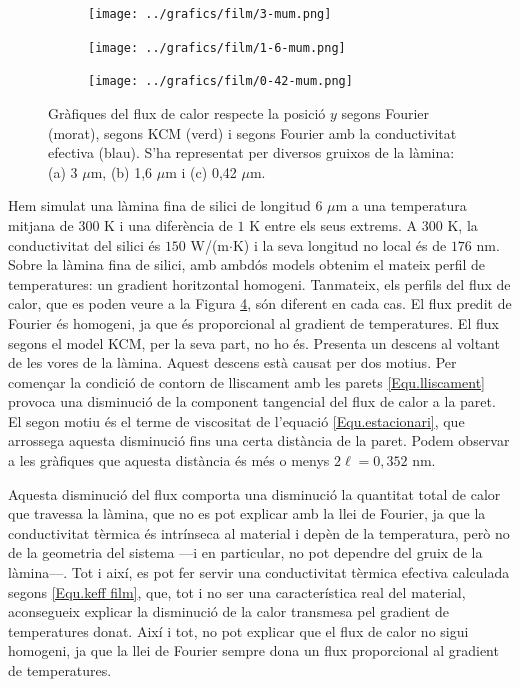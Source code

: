 \documentclass{article}
\begin{document}
\begin{figure}[ht!]
\begin{center}
\begin{subfigure}{.5\textwidth}
\caption{}
\label{Fig:3mum}
\texttt{[image: ../grafics/film/3-mum.png]}
\end{subfigure}
\begin{subfigure}{.45\textwidth}
\caption{}
\label{Fig:1,6mum}
\texttt{[image: ../grafics/film/1-6-mum.png]}
\end{subfigure}
\begin{subfigure}{.4\textwidth}
\caption{}
\label{Fig:0,42mum}
\texttt{[image: ../grafics/film/0-42-mum.png]}
\end{subfigure}
\caption{Gr\`{a}fiques del flux de calor respecte la posici\'{o} $y$ segons Fourier (morat), segons KCM (verd) i segons Fourier amb la conductivitat efectiva (blau). S'ha representat per diversos gruixos de la l\`{a}mina: (a) 3 $\mu$m, (b) 1,6 $\mu$m i (c) 0,42 $\mu$m.}
\label{Fig:Fluxoslaminars}
\end{center}
\end{figure}

Hem simulat una l\`{a}mina fina de silici de longitud $6$ $\mu$m a una temperatura mitjana de $300$ K i una difer\`{e}ncia de $1$ K entre els seus extrems. A $300$ K, la conductivitat del silici \'{e}s $150$ W/(m$\cdot$K) i la seva longitud no local \'{e}s de $176$ nm. Sobre la l\`{a}mina fina de silici, amb ambd\'{o}s models obtenim el mateix perfil de temperatures: un gradient horitzontal homogeni. Tanmateix, els perfils del flux de calor, que es poden veure a la Figura \ref{Fig:Fluxoslaminars}, s\'{o}n diferent en cada cas. El flux predit de Fourier \'{e}s homogeni, ja que \'{e}s proporcional al gradient de temperatures. El flux segons el model KCM, per la seva part, no ho \'{e}s. Presenta un descens al voltant de les vores de la l\`{a}mina. Aquest descens est\`{a} causat per dos motius. Per comen\c{c}ar la condici\'{o} de contorn de lliscament amb les parets \eqref{Equ.lliscament} provoca una disminuci\'{o} de la component tangencial del flux de calor a la paret. El segon motiu \'{e}s el terme de viscositat de l'equaci\'{o} \eqref{Equ.estacionari}, que arrossega aquesta disminuci\'{o} fins una certa dist\`{a}ncia de la paret. Podem observar a les gr\`{a}fiques que aquesta dist\`{a}ncia \'{e}s m\'{e}s o menys $2\ell=0,352$ nm.

Aquesta disminuci\'{o} del flux comporta una disminuci\'{o} la quantitat total de calor que travessa la l\`{a}mina, que no es pot explicar amb la llei de Fourier, ja que la conductivitat t\`{e}rmica \'{e}s intr\'{i}nseca al material i dep\`{e}n de la temperatura, per\`{o} no de la geometria del sistema ---i en particular, no pot dependre del gruix de la l\`{a}mina---. Tot i aix\'{i}, es pot fer servir una conductivitat t\`{e}rmica efectiva calculada segons \eqref{Equ.keff film}, que, tot i no ser una caracter\'{i}stica real del material, aconsegueix explicar la disminuci\'{o} de la calor transmesa pel gradient de temperatures donat. Aix\'{i} i tot, no pot explicar que el flux de calor no sigui homogeni, ja que la llei de Fourier sempre dona un flux proporcional al gradient de temperatures.
\end{document}
